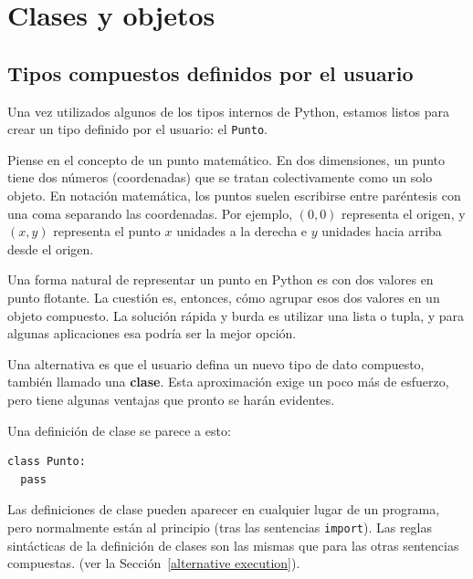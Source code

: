 
\chapter{Clases y objetos}

 

\section{Tipos compuestos definidos por el usuario}

\label{point}  
 

Una vez utilizados algunos de los tipos internos de Python, estamos
listos para crear un tipo definido por el usuario: el \texttt{Punto}.

Piense en el concepto de un punto matemático. En dos dimensiones,
un punto tiene dos números (coordenadas) que se tratan colectivamente
como un solo objeto. En notación matemática, los puntos suelen escribirse
entre paréntesis con una coma separando las coordenadas. Por ejemplo,
$(0,0)$ representa el origen, y $(x,y)$ representa el punto $x$
unidades a la derecha e $y$ unidades hacia arriba desde el origen.

Una forma natural de representar un punto en Python es con dos valores
en punto flotante. La cuestión es, entonces, cómo agrupar esos dos
valores en un objeto compuesto. La solución rápida y burda es utilizar
una lista o tupla, y para algunas aplicaciones esa podría ser la mejor
opción.


Una alternativa es que el usuario defina un nuevo tipo de dato compuesto,
también llamado una \textbf{clase}. Esta aproximación exige un poco
más de esfuerzo, pero tiene algunas ventajas que pronto se harán evidentes.

Una definición de clase se parece a esto:
\begin{verbatim}
class Punto:
  pass
\end{verbatim}

Las definiciones de clase pueden aparecer en cualquier lugar de un
programa, pero normalmente están al principio (tras las sentencias
\texttt{import}). Las reglas sintácticas de la definición de clases
son las mismas que para las otras sentencias compuestas. (ver la Sección~\ref{alternative execution}).

